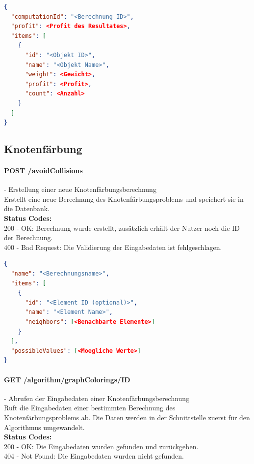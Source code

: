 \begin{lstlisting}[language=JSON, caption=Beispiel eines Endresultates für das Rucksack Problem, label=lst:solution_knapsack]  
{
  "computationId": "<Berechnung ID>",
  "profit": <Profit des Resultates>,
  "items": [
    {
      "id": "<Objekt ID>",
      "name": "<Objekt Name>",
      "weight": <Gewicht>,
      "profit": <Profit>,
      "count": <Anzahl>
    }
  ]
}
\end{lstlisting}

%
%
%
%

\subsection{Knotenfärbung}

\paragraph{POST /avoidCollisions} - Erstellung einer neue Knotenfärbungsberechnung\mbox{}\\
Erstellt eine neue Berechnung des Knotenfärbungsproblems und speichert sie in die Datenbank.\\
\textbf{Status Codes:}\\
200 - OK: Berechnung wurde erstellt, zusätzlich erhält der Nutzer noch die ID der Berechnung.\\
400 - Bad Request: Die Validierung der Eingabedaten ist fehlgeschlagen.\\

\begin{lstlisting}[language=JSON, caption=Beispiel einer Eingabe für das Knotenfärbungsproblem, label=lst:input_graphcoloring]  
{
  "name": "<Berechnungsname>",
  "items": [
    {
      "id": "<Element ID (optional)>",
      "name": "<Element Name>",
      "neighbors": [<Benachbarte Elemente>]
    }
  ],
  "possibleValues": [<Moegliche Werte>]
}
\end{lstlisting}

\paragraph{GET /algorithm/graphColorings/{ID}} - Abrufen der Eingabedaten einer Knotenfärbungsberechnung\mbox{}\\
Ruft die Eingabedaten einer bestimmten Berechnung des Knotenfärbungsproblems ab. Die Daten werden in der Schnittstelle zuerst für den Algorithmus umgewandelt.\\
\textbf{Status Codes:}\\
200 - OK: Die Eingabedaten wurden gefunden und zurückgeben.\\
404 - Not Found: Die Eingabedaten wurden nicht gefunden.\\

